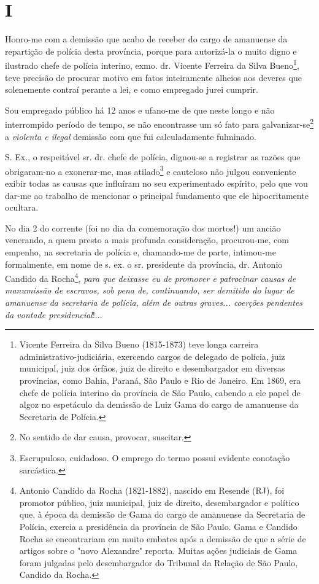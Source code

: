 \section*{I}

Honro-me com a demissão que acabo de receber do cargo de amanuense da
repartição de polícia desta província, porque para autorizá-la o muito
digno e ilustrado chefe de polícia interino, exmo. dr. Vicente Ferreira
da Silva Bueno\footnote{Vicente Ferreira da Silva Bueno (1815-1873)
  teve longa carreira administrativo-judiciária, exercendo cargos de
  delegado de polícia, juiz municipal, juiz dos órfãos, juiz de direito
  e desembargador em diversas províncias, como Bahia, Paraná, São Paulo
  e Rio de Janeiro. Em 1869, era chefe de polícia interino da província
  de São Paulo, cabendo a ele papel de algoz no espetáculo da demissão
  de Luiz Gama do cargo de amanuense da Secretaria de Polícia.}, teve
precisão de procurar motivo em fatos inteiramente alheios aos deveres
que solenemente contraí perante a lei, e como empregado jurei cumprir.

Sou empregado público há 12 anos e ufano-me de que neste longo e não
interrompido período de tempo, se não encontrasse um só fato para
galvanizar-se\footnote{No sentido de dar causa, provocar, suscitar.} a
\emph{violenta e ilegal} demissão com que fui calculadamente fulminado.

S. Ex., o respeitável sr. dr. chefe de polícia, dignou-se a registrar as
razões que obrigaram-no a exonerar-me, mas atilado\footnote{
  Escrupuloso, cuidadoso. O emprego do termo possui evidente conotação
  sarcástica.} e cauteloso não julgou conveniente exibir todas as causas
que influíram no seu experimentado espírito, pelo que vou dar-me ao
trabalho de mencionar o principal fundamento que ele hipocritamente
ocultara.

No dia 2 do corrente (foi no dia da comemoração dos mortos!) um ancião
venerando, a quem presto a mais profunda consideração, procurou-me, com
empenho, na secretaria de polícia e, chamando-me de parte, intimou-me
formalmente, em nome de s. ex. o sr. presidente da província, dr.
Antonio Candido da Rocha\footnote{Antonio Candido da Rocha
  (1821-1882), nascido em Resende (RJ), foi promotor público, juiz
  municipal, juiz de direito, desembargador e político que, à época da
  demissão de Gama do cargo de amanuense da Secretaria de Polícia,
  exercia a presidência da província de São Paulo. Gama e Candido Rocha
  se encontrariam em muito embates após a demissão de que a série de
  artigos sobre o "novo Alexandre" reporta. Muitas ações judiciais de
  Gama foram julgadas pelo desembargador do Tribunal da Relação de São
  Paulo, Candido da Rocha.}, \emph{para que deixasse eu de promover e
patrocinar causas de manumissão de escravos, sob pena de, continuando,
ser demitido do lugar de amanuense da secretaria de polícia, além de
outras graves... coerções pendentes da vontade presidencial}!...


